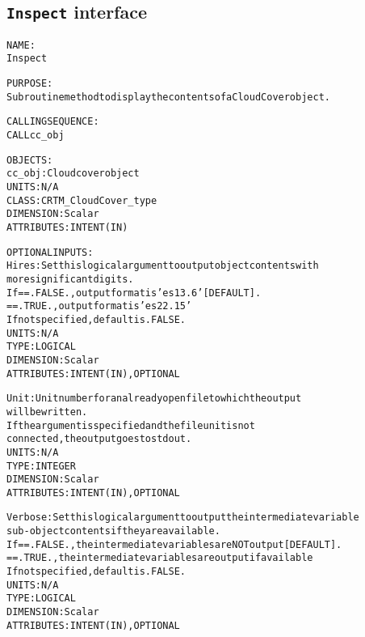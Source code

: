 \subsection{\texttt{Inspect} interface}
  \label{sec:Inspect_interface}
  \begin{alltt}
 
  NAME:
    Inspect
 
  PURPOSE:
    Subroutine method to display the contents of a CloudCover object.
 
  CALLING SEQUENCE:
    CALL cc_obj%Inspect( Hires=hires, Unit=unit, Verbose=Verbose )
 
  OBJECTS:
    cc_obj:  Cloud cover object
             UNITS:      N/A
             CLASS:      CRTM_CloudCover_type
             DIMENSION:  Scalar
             ATTRIBUTES: INTENT(IN)
 
  OPTIONAL INPUTS:
    Hires:   Set this logical argument to output object contents with
             more significant digits.
             If == .FALSE., output format is 'es13.6' [DEFAULT].
                == .TRUE.,  output format is 'es22.15'
             If not specified, default is .FALSE.
             UNITS:      N/A
             TYPE:       LOGICAL
             DIMENSION:  Scalar
             ATTRIBUTES: INTENT(IN), OPTIONAL
 
    Unit:    Unit number for an already open file to which the output
             will be written.
             If the argument is specified and the file unit is not
             connected, the output goes to stdout.
             UNITS:      N/A
             TYPE:       INTEGER
             DIMENSION:  Scalar
             ATTRIBUTES: INTENT(IN), OPTIONAL
 
    Verbose: Set this logical argument to output the intermediate variable
             sub-object contents if they are available.
             If == .FALSE., the intermediate variables are NOT output [DEFAULT].
                == .TRUE.,  the intermediate variables are output if available
             If not specified, default is .FALSE.
             UNITS:      N/A
             TYPE:       LOGICAL
             DIMENSION:  Scalar
             ATTRIBUTES: INTENT(IN), OPTIONAL
 
  \end{alltt}
